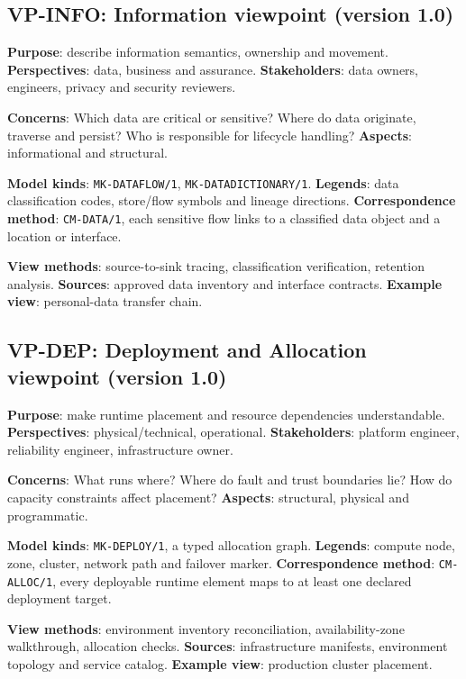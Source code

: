 \documentclass[11pt,letterpaper]{article}
\begin{document}
\subsection{VP-INFO: Information viewpoint (version 1.0)}
\textbf{Purpose}: describe information semantics, ownership and movement. \textbf{Perspectives}: data, business and assurance. \textbf{Stakeholders}: data owners, engineers, privacy and security reviewers.\par
\textbf{Concerns}: Which data are critical or sensitive? Where do data originate, traverse and persist? Who is responsible for lifecycle handling? \textbf{Aspects}: informational and structural.\par
\textbf{Model kinds}: \texttt{MK-DATAFLOW/1}, \texttt{MK-DATADICTIONARY/1}. \textbf{Legends}: data classification codes, store/flow symbols and lineage directions. \textbf{Correspondence method}: \texttt{CM-DATA/1}, each sensitive flow links to a classified data object and a location or interface.\par
\textbf{View methods}: source-to-sink tracing, classification verification, retention analysis. \textbf{Sources}: approved data inventory and interface contracts. \textbf{Example view}: personal-data transfer chain.\par
\subsection{VP-DEP: Deployment and Allocation viewpoint (version 1.0)}
\textbf{Purpose}: make runtime placement and resource dependencies understandable. \textbf{Perspectives}: physical/technical, operational. \textbf{Stakeholders}: platform engineer, reliability engineer, infrastructure owner.\par
\textbf{Concerns}: What runs where? Where do fault and trust boundaries lie? How do capacity constraints affect placement? \textbf{Aspects}: structural, physical and programmatic.\par
\textbf{Model kinds}: \texttt{MK-DEPLOY/1}, a typed allocation graph. \textbf{Legends}: compute node, zone, cluster, network path and failover marker. \textbf{Correspondence method}: \texttt{CM-ALLOC/1}, every deployable runtime element maps to at least one declared deployment target.\par
\textbf{View methods}: environment inventory reconciliation, availability-zone walkthrough, allocation checks. \textbf{Sources}: infrastructure manifests, environment topology and service catalog. \textbf{Example view}: production cluster placement.\par
\end{document}
